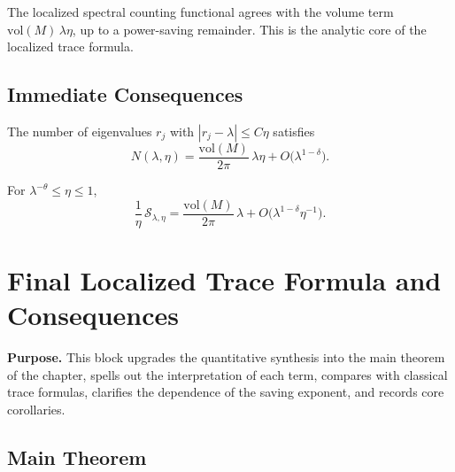 \begin{remark}[Interpretation]
The localized spectral counting functional agrees with the volume term $\mathrm{vol}(M)\,\lambda\eta$, up to a power-saving remainder.  
This is the analytic core of the localized trace formula.
\end{remark}

\subsection{Immediate Consequences}

\begin{corollary}\label{cor:7.7-weyl}
The number of eigenvalues $r_j$ with $|r_j-\lambda|\le C\eta$ satisfies
\[
  N(\lambda,\eta)
  = \frac{\mathrm{vol}(M)}{2\pi}\,\lambda\eta
    + O\!\big(\lambda^{1-\delta}\big).
\]
\end{corollary}

\begin{corollary}\label{cor:7.7-density}
For $\lambda^{-\theta}\le \eta\le 1$,
\[
  \frac{1}{\eta}\,\mathcal{S}_{\lambda,\eta}
  = \frac{\mathrm{vol}(M)}{2\pi}\,\lambda
    + O\!\big(\lambda^{1-\delta}\eta^{-1}\big).
\]
\end{corollary}


\section{Final Localized Trace Formula and Consequences} \label{sec:7.2-final}

\noindent\textbf{Purpose.}
This block upgrades the quantitative synthesis into the main theorem of the chapter,
spells out the interpretation of each term, compares with classical trace formulas,
clarifies the dependence of the saving exponent, and records core corollaries.

\subsection{Main Theorem} \label{subsec:7.2-main-theorem}

